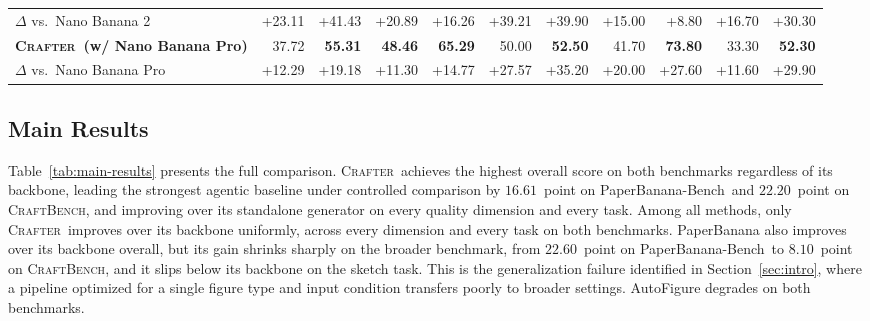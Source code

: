 \documentclass{article}
\newcommand{\Crafter}{\textsc{Crafter}\xspace}
\newcommand{\CrafterBench}{\textsc{CraftBench}\xspace}
\newcommand{\PaperBananaBench}{PaperBanana-Bench\xspace}
\begin{document}
\begin{table}[t]
{\begin{tabular}{lrrrrrrrrrr}
\rowcolor{gray!8} \quad $\Delta$ vs.\ Nano Banana 2 & +23.11 & +41.43 & +20.89 & +16.26 & +39.21 & +39.90 & +15.00 & +8.80 & +16.70 & +30.30 \\
\rowcolor{blue!8} \textbf{\Crafter\ (w/ Nano Banana Pro)} & 37.72 & \textbf{55.31} & \textbf{48.46} & \textbf{65.29} & 50.00 & \textbf{52.50} & 41.70 & \textbf{73.80} & 33.30 & \textbf{52.30} \\
\rowcolor{gray!8} \quad $\Delta$ vs.\ Nano Banana Pro & +12.29 & +19.18 & +11.30 & +14.77 & +27.57 & +35.20 & +20.00 & +27.60 & +11.60 & +29.90 \\
\bottomrule
\end{tabular}
}
\end{table}

\subsection{Main Results}
\label{sec:exp-headline}

Table~\ref{tab:main-results} presents the full comparison. \Crafter\ achieves the highest overall score on both benchmarks regardless of its backbone, leading the strongest agentic baseline under controlled comparison by $16.61$~point on \PaperBananaBench\ and $22.20$~point on \CrafterBench, and improving over its standalone generator on every quality dimension and every task. Among all methods, only \Crafter\ improves over its backbone uniformly, across every dimension and every task on both benchmarks. PaperBanana also improves over its backbone overall, but its gain shrinks sharply on the broader benchmark, from $22.60$~point on \PaperBananaBench\ to $8.10$~point on \CrafterBench, and it slips below its backbone on the sketch task. This is the generalization failure identified in Section~\ref{sec:intro}, where a pipeline optimized for a single figure type and input condition transfers poorly to broader settings. AutoFigure degrades on both benchmarks.
\end{document}
